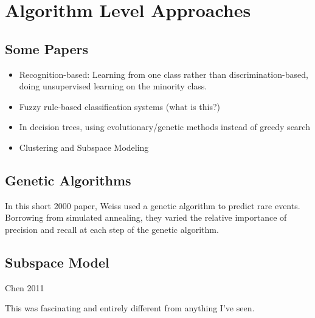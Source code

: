 \section{Algorithm Level Approaches}

\subsection{Some Papers}
\begin{itemize}
	\item Recognition-based:  Learning from one class rather than discrimination-based, doing unsupervised learning on the minority class. \cite{CHAWLA_2004}
	\item Fuzzy rule-based classification systems (what is this?)
		\cite{CHABBOUH_2019} 
		\cite{DABLAIN_2021}
		\cite{MAHMUDAH_2021} 
		\cite{ZHAI_2020} 
		\cite{ZHAI_2020_D2GAN}
	\item In decision trees, using evolutionary/genetic methods instead of greedy search 
		\cite{CHABBOUH_2019} 
		\cite{WEISS_2000}
	\item Clustering and Subspace Modeling \cite{CHEN_2011}
\end{itemize}

\subsection{Genetic Algorithms}

In this short 2000 paper, Weiss \cite{WEISS_2000} used a genetic algorithm to predict rare events. Borrowing from simulated annealing, they varied the relative importance of precision and recall at each step of the genetic algorithm.  

\subsection{Subspace Model}

Chen 2011 \cite{CHEN_2011}

This was fascinating and entirely different from anything I've seen.  

